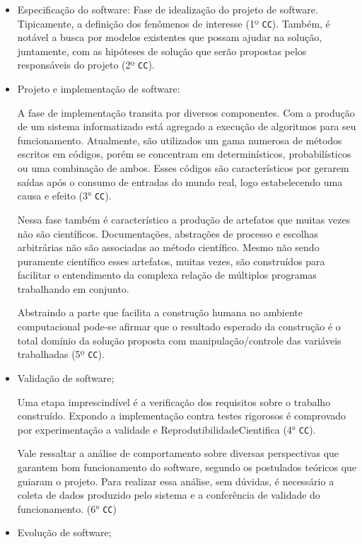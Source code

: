 \begin{itemize}
    \item Especificação do software: Fase de idealização do projeto de software. Tipicamente, a definição dos fenômenos de interesse (1º \texttt{CC}).
    Também, é notável a busca por modelos existentes que possam ajudar na solução, juntamente, com as hipóteses de solução que serão propostas pelos responsáveis do projeto (2º \texttt{CC}).
    \item Projeto e implementação de software:
    
    A fase de implementação transita por diversos componentes. Com a produção de um sistema informatizado está agregado a execução de algoritmos para seu funcionamento. Atualmente, são utilizados um gama numerosa de métodos escritos em códigos, porém se concentram em determinísticos, probabilísticos ou uma combinação de ambos. Esses códigos são característicos por gerarem saídas após o consumo de entradas do mundo real, logo estabelecendo uma causa e efeito (3° \texttt{CC}). 
    
    Nessa fase também é característico a produção de artefatos que muitas vezes não são científicos. Documentações, abstrações de processo e escolhas arbitrárias não são associadas ao método científico. Mesmo não sendo puramente científico esses artefatos, muitas vezes, são construídos para facilitar o entendimento da complexa relação de múltiplos programas trabalhando em conjunto.
    
    Abstraindo a parte que facilita a construção humana no ambiente computacional pode-se afirmar que o resultado esperado da construção é o total domínio da solução proposta com manipulação/controle das variáveis trabalhadas (5º \texttt{CC}). 
    
    \item Validação de software;
    
    Uma etapa imprescindível é a verificação dos requisitos sobre o trabalho construído. Expondo a implementação contra testes rigorosos é comprovado por experimentação a validade e \gls{ReprodutibilidadeCientifica} (4° \texttt{CC}).
    
    Vale ressaltar a análise de comportamento sobre diversas perspectivas que garantem bom funcionamento do software, segundo os postulados teóricos que guiaram o projeto. Para realizar essa análise, sem dúvidas, é necessário a coleta de dados produzido pelo sistema e a conferência de validade do funcionamento. (6° \texttt{CC}) 
    
    \item Evolução de software;
    

\end{itemize}
